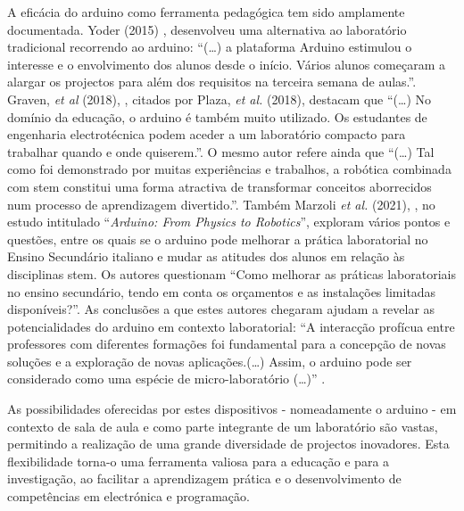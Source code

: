 A eficácia do \gls{arduino} como ferramenta pedagógica tem sido amplamente documentada. Yoder (2015) \cite{yoder}, desenvolveu uma alternativa ao laboratório tradicional recorrendo ao \gls{arduino}: ``(\dots) a plataforma Arduino estimulou o interesse e o envolvimento dos alunos desde o início. Vários alunos começaram a alargar os projectos para além dos requisitos na terceira semana de aulas.''. Graven, \textit{et al} (2018), \cite{graven}, citados por Plaza, \textit{et al.} (2018), \cite{plaza} destacam que ``(\ldots) No domínio da educação, o \gls{arduino} é também muito utilizado. Os estudantes de engenharia electrotécnica podem aceder a um laboratório compacto para trabalhar quando e onde quiserem.''. O mesmo autor refere ainda que ``(\ldots) Tal como foi demonstrado por muitas experiências e trabalhos, a robótica combinada com \acrshort{stem} constitui uma forma atractiva de transformar conceitos aborrecidos num processo de aprendizagem divertido.''. Também Marzoli \textit{et al.} (2021), \cite{Marzoli}, no estudo intitulado ``\textit{Arduino: From Physics to Robotics}'', exploram vários pontos e questões, entre os quais se o \gls{arduino} pode melhorar a prática laboratorial no Ensino Secundário italiano e mudar as atitudes dos alunos em relação às disciplinas \acrshort{stem}. Os autores questionam ``Como melhorar as práticas laboratoriais no ensino secundário, tendo em conta os orçamentos e as instalações limitadas disponíveis?''. As conclusões a que estes autores chegaram ajudam a revelar as potencialidades do \gls{arduino} em contexto laboratorial: ``A interacção profícua entre professores com diferentes formações foi fundamental para a concepção de novas soluções e a exploração de novas aplicações.(\ldots) Assim, o \gls{arduino} pode ser considerado como uma espécie de micro-laboratório (\ldots)'' \cite{Marzoli}.

As possibilidades oferecidas por estes dispositivos - nomeadamente o \gls{arduino} - em contexto de sala de aula e como parte integrante de um laboratório são vastas, permitindo a realização de uma grande diversidade de projectos inovadores. Esta flexibilidade torna-o uma ferramenta valiosa para a educação e para a investigação, ao facilitar a aprendizagem prática e o desenvolvimento de competências em electrónica e programação.

